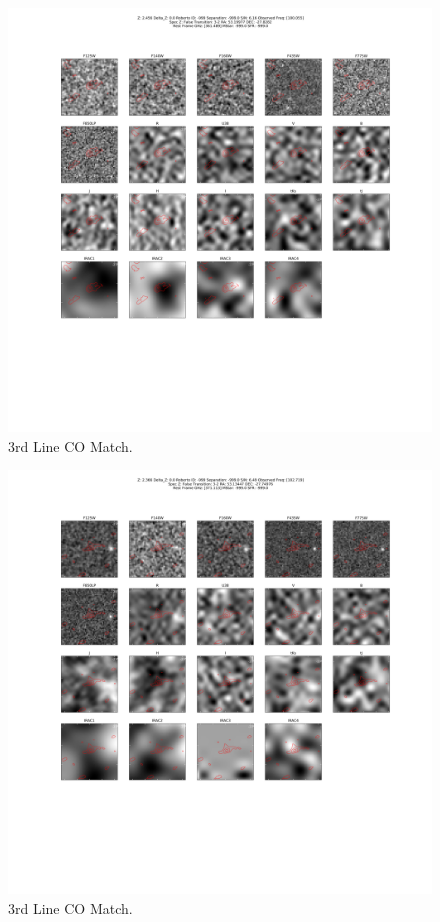 \begin{figure}[tbp]
\centering \includegraphics[width=120mm]{Matched/ASPECS_Cutout_23.png}
\caption{3rd Line CO Match.}
\label{fig:Match_Three}
\end{figure}

\begin{figure}[tbp]
\centering \includegraphics[width=120mm]{Matched/ASPECS_Cutout_24.png}
\caption{3rd Line CO Match.}
\label{fig:Match_Three}
\end{figure}

